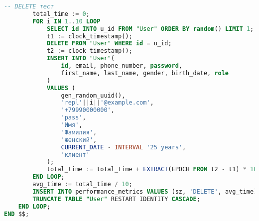 \newpage
\begin{lstlisting}[language=SQL,
	label=alg:perf_study2,
	caption={Исследование производительности операций \texttt{INSERT}, \texttt{SELECT}, \texttt{UPDATE} и \texttt{DELETE} на таблице \texttt{User} -- конец},
	captionpos=t,
	basicstyle=\ttfamily\small]
		-- DELETE тест
		total_time := 0;
		FOR i IN 1..10 LOOP
			SELECT id INTO u_id FROM "User" ORDER BY random() LIMIT 1;
			t1 := clock_timestamp();
			DELETE FROM "User" WHERE id = u_id;
			t2 := clock_timestamp();
			INSERT INTO "User"(
				id, email, phone_number, password, 
				first_name, last_name, gender, birth_date, role
			)
			VALUES (
				gen_random_uuid(),
				'repl'||i||'@example.com', 
				'+79990000000', 
				'pass', 
				'Имя', 
				'Фамилия', 
				'женский', 
				CURRENT_DATE - INTERVAL '25 years', 
				'клиент'
			);
			total_time := total_time + EXTRACT(EPOCH FROM t2 - t1) * 1000;
		END LOOP;
		avg_time := total_time / 10;
		INSERT INTO performance_metrics VALUES (sz, 'DELETE', avg_time);
		TRUNCATE TABLE "User" RESTART IDENTITY CASCADE;
	END LOOP;
END $$;
\end{lstlisting}


